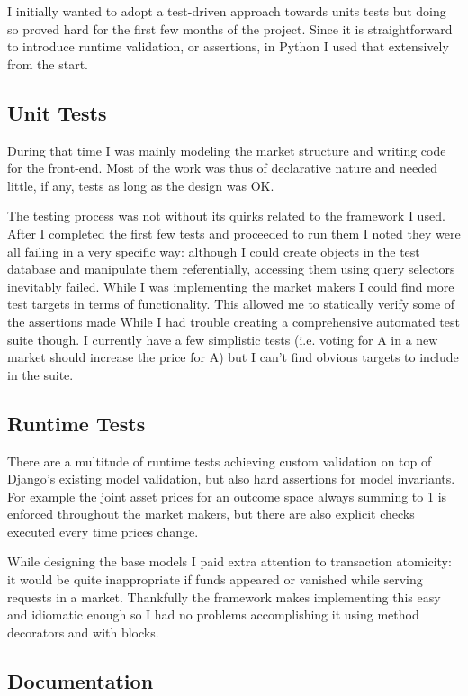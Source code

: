 \documentclass[bsc,frontabs,twoside,singlespacing,parskip,deptreport]{infthesis}     %
\begin{document}
	I initially wanted to adopt a test-driven approach towards units tests but doing so proved hard for the first few months of the project. Since it is straightforward to introduce runtime validation, or assertions, in Python I used that extensively from the start. 
\subsection{Unit Tests}
	During that time I was mainly modeling the market structure and writing code for the front-end. Most of the work was thus of declarative nature and needed little, if any, tests as long as the design was OK. 

	The testing process was not without its quirks related to the framework I used. After I completed the first few tests and proceeded to run them I noted they were all failing in a very specific way: although I could create objects in the test database and manipulate them referentially, accessing them using query selectors inevitably failed. 
	While I was implementing the market makers I could find more test targets in terms of functionality. This allowed me to statically verify some of the assertions made 
While I had trouble creating a comprehensive automated test suite though. I currently have a few simplistic tests (i.e. voting for A in a new market should increase the price for A) but I can’t find obvious targets to include in the suite.
\subsection{Runtime Tests}
    There are a multitude of runtime tests achieving custom validation on top of Django’s existing model validation, but also hard assertions for model invariants. For example the joint asset prices for an outcome space always summing to 1 is enforced throughout the market makers, but there are also explicit checks executed every time prices change.

    While designing the base models I paid extra attention to transaction atomicity: it would be quite inappropriate if funds appeared or vanished while serving requests in a market. Thankfully the framework makes implementing this easy and idiomatic enough so I had no problems accomplishing it using method decorators and with blocks.

\subsection{Documentation}
\end{document}
